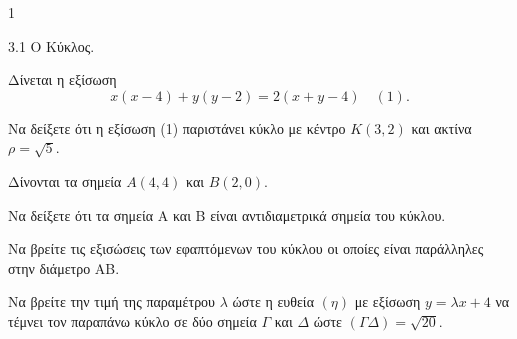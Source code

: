 \begin{ylh}{1}
    \item 3.1 Ο Κύκλος.
\end{ylh}
Δίνεται η εξίσωση
\[ x(x-4)+y(y-2)=2(x+y-4)\quad (1) . \]
\begin{alist}
\item Να δείξετε ότι η εξίσωση (1) παριστάνει κύκλο με κέντρο $K(3,2)$ και ακτίνα $\rho=\sqrt{5}$. 
\item Δίνονται τα σημεία $A(4,4)$ και $B(2,0)$.
    \begin{rlist}
    \item Να δείξετε ότι τα σημεία A και B είναι αντιδιαμετρικά σημεία του κύκλου. 
    \item Να βρείτε τις εξισώσεις των εφαπτόμενων του κύκλου οι οποίες είναι παράλληλες στην διάμετρο AB. 
    \end{rlist}
\item Να βρείτε την τιμή της παραμέτρου $\lambda$ ώστε η ευθεία $(\eta)$ με εξίσωση $y=\lambda x+4$ να τέμνει τον παραπάνω κύκλο σε δύο σημεία $\Gamma$ και $\Delta$ ώστε $(\Gamma\Delta)=\sqrt{20}$. 
\end{alist}
